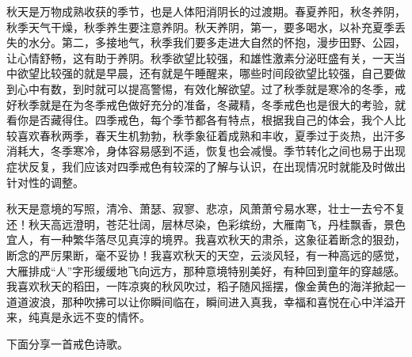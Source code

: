 秋天是万物成熟收获的季节，也是人体阳消阴长的过渡期。春夏养阳，秋冬养阴，秋季天气干燥，秋季养生要注意养阴。秋天养阴，第一，要多喝水，以补充夏季丢失的水分。第二，多接地气，秋季我们要多走进大自然的怀抱，漫步田野、公园，让心情舒畅，这有助于养阴。秋季欲望比较强，和雄性激素分泌旺盛有关，一天当中欲望比较强的就是早晨，还有就是午睡醒来，哪些时间段欲望比较强，自己要做到心中有数，到时就可以提高警惕，有效化解欲望。过了秋季就是寒冷的冬季，戒好秋季就是在为冬季戒色做好充分的准备，冬藏精，冬季戒色也是很大的考验，就看你是否藏得住。四季戒色，每个季节都各有特点，根据我自己的体会，我个人比较喜欢春秋两季，春天生机勃勃，秋季象征着成熟和丰收，夏季过于炎热，出汗多消耗大，冬季寒冷，身体容易感到不适，恢复也会减慢。季节转化之间也易于出现症状反复，我们应该对四季戒色有较深的了解与认识，在出现情况时就能及时做出针对性的调整。

秋天是意境的写照，清冷、萧瑟、寂寥、悲凉，风萧萧兮易水寒，壮士一去兮不复还！秋天高远澄明，苍茫壮阔，层林尽染，色彩缤纷，大雁南飞，丹桂飘香，景色宜人，有一种繁华落尽见真淳的境界。我喜欢秋天的肃杀，这象征着断念的狠劲，断念的严厉果断，毫不妥协！我喜欢秋天的天空，云淡风轻，有一种高远的感觉，大雁排成“人”字形缓缓地飞向远方，那种意境特别美好，有种回到童年的穿越感。我喜欢秋天的稻田，一阵凉爽的秋风吹过，稻子随风摇摆，像金黄色的海洋掀起一道道波浪，那种吹拂可以让你瞬间临在，瞬间进入真我，幸福和喜悦在心中洋溢开来，纯真是永远不变的情怀。

下面分享一首戒色诗歌。

